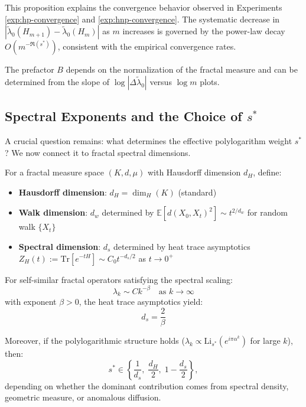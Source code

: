 \begin{remark}
This proposition explains the convergence behavior observed in Experiments \ref{exp:hp-convergence} and \ref{exp:hnp-convergence}. The systematic decrease in $|\tilde\lambda_0(H_{m+1}) - \tilde\lambda_0(H_m)|$ as $m$ increases is governed by the power-law decay $O(m^{-\Re(s^*)})$, consistent with the empirical convergence rates.

The prefactor $B$ depends on the normalization of the fractal measure and can be determined from the slope of $\log|\Delta \tilde\lambda_0|$ versus $\log m$ plots.
\end{remark}

\subsection{Spectral Exponents and the Choice of \texorpdfstring{$s^*$}{s*}}

A crucial question remains: what determines the effective polylogarithm weight $s^*$? We now connect it to fractal spectral dimensions.

\begin{definition}\label{def:spectral-dimensions}
For a fractal measure space $(K, d, \mu)$ with Hausdorff dimension $d_H$, define:
\begin{itemize}
\item \textbf{Hausdorff dimension}: $d_H = \dim_H(K)$ (standard)
\item \textbf{Walk dimension}: $d_w$ determined by $\mathbb{E}[d(X_0, X_t)^2] \sim t^{2/d_w}$ for random walk $\{X_t\}$
\item \textbf{Spectral dimension}: $d_s$ determined by heat trace asymptotics $Z_H(t) := \text{Tr}[e^{-tH}] \sim C_0 t^{-d_s/2}$ as $t \to 0^+$
\end{itemize}
\end{definition}

\begin{proposition}\label{prop:spectral-scaling}
For self-similar fractal operators satisfying the spectral scaling:
\[
\lambda_k \sim C k^{-\beta} \quad \text{as } k \to \infty
\]
with exponent $\beta > 0$, the heat trace asymptotics yield:
\[
d_s = \frac{2}{\beta}
\]

Moreover, if the polylogarithmic structure holds ($\lambda_k \propto \mathrm{Li}_{s^*}(e^{i\pi\alpha^k})$ for large $k$), then:
\[
s^\ast \in \left\{\frac{1}{d_s},\;\frac{d_H}{2},\;1-\frac{d_s}{2}\right\},
\]
depending on whether the dominant contribution comes from spectral density, geometric measure, or anomalous diffusion.
\end{proposition}

